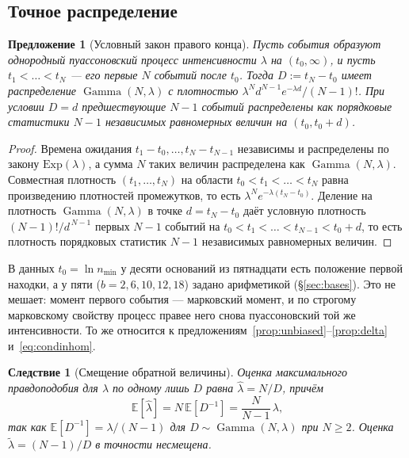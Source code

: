 \documentclass[11pt,a4paper]{article}
\theoremstyle{plain}
\newtheorem{proposition}{Предложение}
\newtheorem{corollary}{Следствие}
\theoremstyle{remark}
\DeclareMathOperator{\Gam}{Gamma}
\begin{document}
\subsection{Точное распределение}

\begin{proposition}[Условный закон правого конца]\label{prop:gamma}
Пусть события образуют однородный пуассоновский процесс интенсивности $\lambda$ на
$(t_0,\infty)$, и пусть $t_1<\dots<t_N$ --- его первые $N$ событий после $t_0$.
Тогда $D:=t_N-t_0$ имеет распределение $\Gam(N,\lambda)$ с плотностью
$\lambda^{N}d^{N-1}e^{-\lambda d}/(N-1)!$. При условии $D=d$ предшествующие $N-1$ событий
распределены как порядковые статистики $N-1$ независимых равномерных величин на
$(t_0,t_0+d)$.
\end{proposition}

\begin{proof}
Времена ожидания $t_1-t_0,\dots,t_N-t_{N-1}$ независимы и распределены по закону
$\mathrm{Exp}(\lambda)$, а сумма $N$ таких величин распределена как $\Gam(N,\lambda)$.
Совместная плотность $(t_1,\dots,t_N)$ на области $t_0<t_1<\dots<t_N$ равна
произведению плотностей промежутков, то есть $\lambda^Ne^{-\lambda(t_N-t_0)}$.
Деление на плотность $\Gam(N,\lambda)$ в точке $d=t_N-t_0$ даёт условную плотность
$(N-1)!/d^{\,N-1}$ первых $N-1$ событий на $t_0<t_1<\dots<t_{N-1}<t_0+d$, то есть
плотность порядковых статистик $N-1$ независимых равномерных величин.
\end{proof}

\noindent В данных $t_0=\ln n_{\min}$ у десяти оснований из пятнадцати есть положение
первой находки, а у пяти ($b=2,6,10,12,18$) задано арифметикой (\S\ref{sec:bases}).
Это не мешает: момент первого события --- марковский момент, и по строгому
марковскому свойству процесс правее него снова пуассоновский той же интенсивности.
То же относится к предложениям~\ref{prop:unbiased}--\ref{prop:delta}
и~\eqref{eq:condinhom}.

\begin{corollary}[Смещение обратной величины]\label{cor:kappa}
Оценка максимального правдоподобия для $\lambda$ по одному лишь $D$ равна
$\hat\lambda=N/D$, причём
\begin{equation}\label{eq:bias}
\mathbb E[\hat\lambda]=N\,\mathbb E[D^{-1}]=\frac{N}{N-1}\,\lambda,
\end{equation}
так как $\mathbb E[D^{-1}]=\lambda/(N-1)$ для $D\sim\Gam(N,\lambda)$ при $N\ge2$.
Оценка $\tilde\lambda=(N-1)/D$ в точности несмещена.
\end{corollary}
\end{document}
